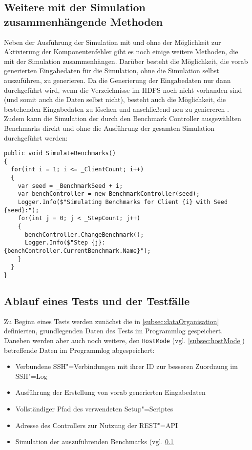 \subsection{Weitere mit der Simulation zusammenhängende Methoden}
\label{subsec:simulationUtilities}

Neben der Ausführung der Simulation mit und ohne der Möglichkeit zur Aktivierung der Komponentenfehler gibt es noch einige weitere Methoden, die mit der Simulation zusammenhängen.
Darüber besteht die Möglichkeit, die vorab generierten Eingabedaten für die Simulation, ohne die Simulation selbst auszuführen, zu generieren.
Da die Generierung der Eingabedaten nur dann durchgeführt wird, wenn die Verzeichnisse im \ac{HDFS} noch nicht vorhanden sind (und somit auch die Daten selbst nicht), besteht auch die Möglichkeit, die bestehenden Eingabedaten zu löschen und anschließend neu zu geniereren .
Zudem kann die Simulation der durch den Benchmark Controller ausgewählten Benchmarks direkt und ohne die Ausführung der gesamten Simulation durchgeführt werden:

\begin{lstlisting}[label=lst:hadoopSimulationBenchmarks,style=cs,
caption={Simulation der auszuführenden Benchmarks}]
public void SimulateBenchmarks()
{
  for(int i = 1; i <= _ClientCount; i++)
  {
    var seed = _BenchmarkSeed + i;
    var benchController = new BenchmarkController(seed);
    Logger.Info($"Simulating Benchmarks for Client {i} with Seed {seed}:");
    for(int j = 0; j < _StepCount; j++)
    {
      benchController.ChangeBenchmark();
      Logger.Info($"Step {j}: {benchController.CurrentBenchmark.Name}");
    }
  }
}
\end{lstlisting}

\subsection{Ablauf eines Tests und der Testfälle}
\label{subsec:simulationStep}

Zu Beginn eines Tests werden zunächst die in \cref{subsec:dataOrganisation} definierten, grundlegenden Daten des Tests im Programmlog gespeichert.
Daneben werden aber auch noch weitere, den \texttt{HostMode} (vgl. \cref{subsec:hostMode}) betreffende Daten im Programmlog abgespeichert:

\begin{itemize}
    \item Verbundene SSH"=Verbindungen mit ihrer ID zur besseren Zuordnung im SSH"=Log
    \item Ausführung der Erstellung von vorab generierten Eingabedaten
    \item Vollständiger Pfad des verwendeten Setup"=Scriptes
    \item Adresse des Controllers zur Nutzung der REST"=API
    \item Simulation der auszuführenden Benchmarks (vgl. \cref{subsec:simulationUtilities}
\end{itemize}

